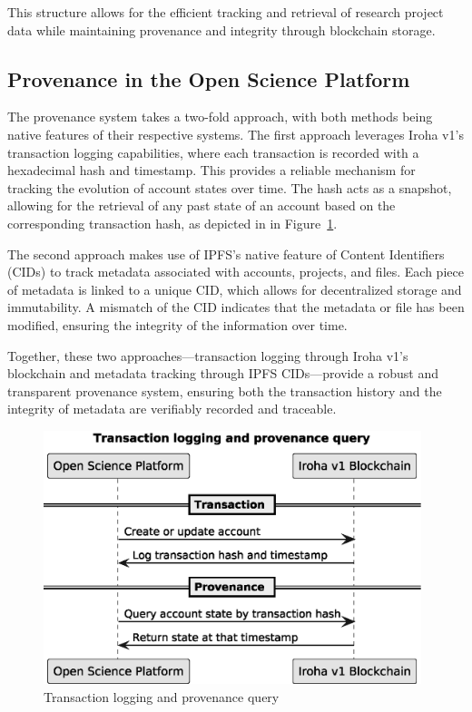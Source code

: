 \documentclass{article}
\begin{document}
This structure allows for the efficient tracking and retrieval of research project data while maintaining provenance and integrity through blockchain storage.

\subsection{Provenance in the Open Science Platform}

The provenance system takes a two-fold approach, with both methods being native features of their respective systems. The first approach leverages Iroha v1’s transaction logging capabilities, where each transaction is recorded with a hexadecimal hash and timestamp. This provides a reliable mechanism for tracking the evolution of account states over time. The hash acts as a snapshot, allowing for the retrieval of any past state of an account based on the corresponding transaction hash, as depicted in in Figure~\ref{fig:provenance}.

The second approach makes use of IPFS’s native feature of Content Identifiers (CIDs) to track metadata associated with accounts, projects, and files. Each piece of metadata is linked to a unique CID, which allows for decentralized storage and immutability. A mismatch of the CID indicates that the metadata or file has been modified, ensuring the integrity of the information over time.

Together, these two approaches—transaction logging through Iroha v1’s blockchain and metadata tracking through IPFS CIDs—provide a robust and transparent provenance system, ensuring both the transaction history and the integrity of metadata are verifiably recorded and traceable.


\begin{figure}[htbp]
      \centering
      \includegraphics[width=0.98\textwidth, keepaspectratio]{provenance_timeline.eps}
      \caption{Transaction logging and provenance query}
      \label{fig:provenance}
\end{figure}
\end{document}
